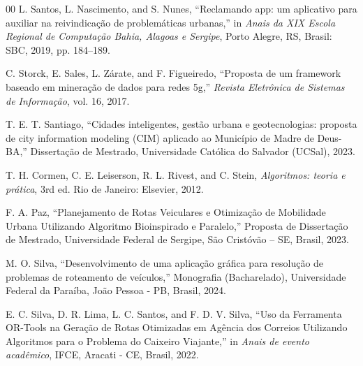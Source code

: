 \documentclass[conference,12pt]{IEEEtran}
\begin{document}
\vspace{-0.3cm}
\begin{thebibliography}{00}
    \fontsize{11.5}{10}\selectfont
     L. Santos, L. Nascimento, and S. Nunes,
    ``Reclamando app: um aplicativo para auxiliar na reivindicação
    de problemáticas urbanas,'' in \textit{Anais da XIX Escola
        Regional de Computação Bahia, Alagoas e Sergipe}, Porto Alegre,
    RS, Brasil: SBC, 2019, pp. 184--189.

     C. Storck, E. Sales, L. Zárate, and F.
    Figueiredo, ``Proposta de um framework baseado em mineração
    de dados para redes 5g,'' \textit{Revista Eletrônica de Sistemas
        de Informação}, vol. 16, 2017.


     T. E. T. Santiago, ``Cidades inteligentes,
    gestão urbana e geotecnologias: proposta de city information modeling
    (CIM) aplicado ao Município de Madre de Deus-BA,'' Dissertação de Mestrado,
    Universidade Católica do Salvador (UCSal), 2023.



     T. H. Cormen, C. E. Leiserson, R. L. Rivest,
    and C. Stein, \textit{Algoritmos: teoria e prática}, 3rd ed. Rio
    de Janeiro: Elsevier, 2012.

     F. A. Paz, ``Planejamento de Rotas Veiculares e
    Otimização de Mobilidade Urbana Utilizando Algoritmo Bioinspirado
    e Paralelo,'' Proposta de Dissertação de Mestrado, Universidade Federal
    de Sergipe, São Cristóvão -- SE, Brasil, 2023.

     M. O. Silva, ``Desenvolvimento de uma aplicação
    gráfica para resolução de problemas de roteamento de veículos,''
    Monografia (Bacharelado), Universidade Federal
    da Paraíba, João Pessoa - PB, Brasil, 2024.

     E. C. Silva, D. R. Lima, L. C. Santos, and F.
    D. V. Silva, ``Uso da Ferramenta OR-Tools na Geração de Rotas
    Otimizadas em Agência dos Correios Utilizando Algoritmos para o
    Problema do Caixeiro Viajante,'' in \textit{Anais de evento acadêmico},
    IFCE, Aracati - CE, Brasil, 2022.


\end{thebibliography}
\end{document}
